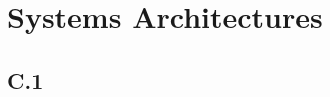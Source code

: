 \newpage\sloppy
\setlength{\RaggedRightRightskip}{0pt plus 2em}
\section{Systems Architectures}

\subsection{C.1}

\fussy
